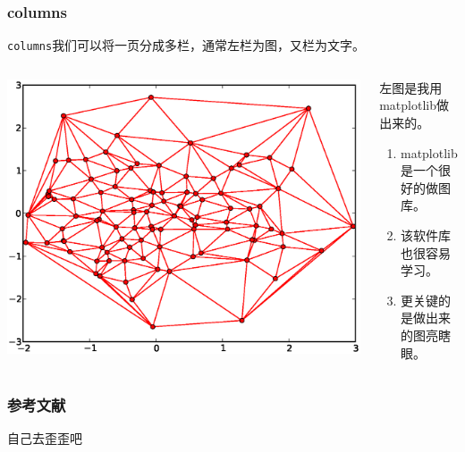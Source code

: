 \documentclass[8pt]{beamer}
\begin{document}
\begin{frame}
  \frametitle{columns}
  \texttt{columns}我们可以将一页分成多栏，通常左栏为图，又栏为文字。
  \begin{columns}[onlytextwidth]
    \begin{column}{0.55\textwidth}
      \includegraphics[width=\columnwidth]{./triangle.eps}
    \end{column}
    \begin{column}{0.45\textwidth}
      左图是我用matplotlib做出来的。
      \begin{enumerate}
      \item matplotlib是一个很好的做图库。
      \item 该软件库也很容易学习。
      \item 更关键的是做出来的图亮瞎眼。
      \end{enumerate}
    \end{column}
  \end{columns}
\end{frame}

\begin{frame}
  \frametitle{参考文献}
  \begin{thebibliography}{99}
  \beamertemplatetextbibitems
   自己去歪歪吧
  \end{thebibliography}
\end{frame}
\end{document}
